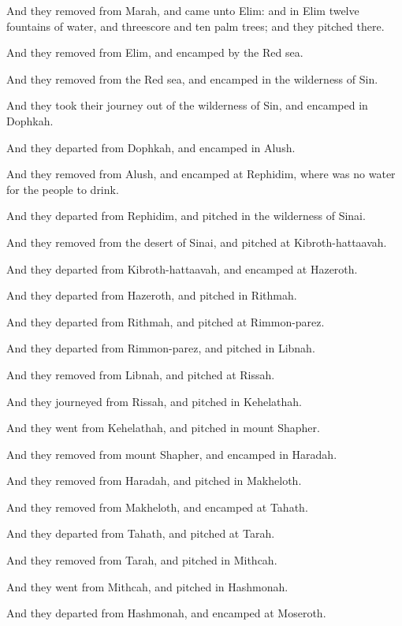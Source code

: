 {And they
removed from
Marah, and
came unto
Elim: and in
Elim
{}
twelve
fountains of
water, and threescore and
ten palm
trees; and they
pitched there.

And they
removed from
Elim, and
encamped by the
Red
sea.

And they
removed from the
Red
sea, and
encamped in the
wilderness of
Sin.

And they took their
journey out of the
wilderness of
Sin, and
encamped in
Dophkah.

And they
departed from
Dophkah, and
encamped in
Alush.

And they
removed from
Alush, and
encamped at
Rephidim, where was no
water for the
people to
drink.

And they
departed from
Rephidim, and
pitched in the
wilderness of
Sinai.

And they
removed from the
desert of
Sinai, and
pitched at
Kibroth-hattaavah.

And they
departed from
Kibroth-hattaavah, and
encamped at
Hazeroth.

And they
departed from
Hazeroth, and
pitched in
Rithmah.

And they
departed from
Rithmah, and
pitched at
Rimmon-parez.

And they
departed from
Rimmon-parez, and
pitched in
Libnah.

And they
removed from
Libnah, and
pitched at
Rissah.

And they
journeyed from
Rissah, and
pitched in
Kehelathah.

And they
went from
Kehelathah, and
pitched in
mount
Shapher.

And they
removed from
mount
Shapher, and
encamped in
Haradah.

And they
removed from
Haradah, and
pitched in
Makheloth.

And they
removed from
Makheloth, and
encamped at
Tahath.

And they
departed from
Tahath, and
pitched at
Tarah.

And they
removed from
Tarah, and
pitched in
Mithcah.

And they
went from
Mithcah, and
pitched in
Hashmonah.

And they
departed from
Hashmonah, and
encamped at
Moseroth.

}
